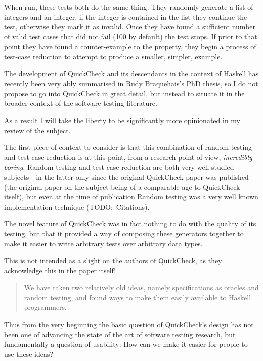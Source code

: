 When run, these tests both do the same thing:
They randomly generate a list of integers and an integer,
if the integer is contained in the list they continue the test,
otherwise they mark it as invalid.
Once they have found a sufficient number of valid test cases that did not fail (100 by default) the test stops.
If prior to that point they have found a counter-example to the property,
they begin a process of test-case reduction to attempt to produce a smaller, simpler, example.

The development of QuickCheck and its descendants in the context of Haskell has recently been very ably summarised in Rudy Braquehais's PhD thesis\cite{matela2017tools},
so I do not propose to go into QuickCheck in great detail,
but instead to situate it in the broader context of the software testing literature.

As a result I will take the liberty to be significantly more opinionated in my review of the subject.

The first piece of context to consider is that this combination of random testing and test-case reduction is at this point,
from a research point of view,
\emph{incredibly boring}.
Random testing and test case reduction are both very well studied subjects---in
the latter only since the original QuickCheck paper was published
(the original paper on the subject being of a comparable age to QuickCheck itself\cite{DBLP:conf/issta/HildebrandtZ00}),
but even at the time of publication Random testing was a very well known implementation technique (TODO:\ Citations).

The novel feature of QuickCheck was in fact nothing to do with the quality of its testing,
but that it provided a way of composing these generators together to make it easier to write arbitrary tests over arbitrary data types.

This is not intended as a slight on the authors of QuickCheck,
as they acknowledge this in the paper itself!

\begin{quote}
We have taken two relatively old ideas, namely specifications as oracles and random testing,
and found ways to make them easily available to Haskell programmers.
\end{quote}

Thus from the very beginning the basic question of QuickCheck's design has not been one of advancing the state of the art of software testing research,
but fundamentally a question of usability:
How can we make it easier for people to use these ideas?

